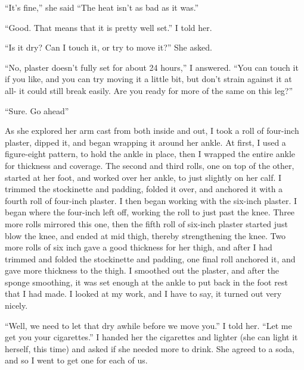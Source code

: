     ``It's fine,'' she said ``The heat isn't as bad as it was.''

    ``Good. That means that it is pretty well set.'' I told her.

    ``Is it dry? Can I touch it, or try to move it?'' She asked.

    ``No, plaster doesn't fully set for about 24 hours,'' I answered. ``You can touch it if you
like, and you can try moving it a little bit, but don't strain against it at all- it could still
break easily. Are you ready for more of the same on this leg?''

    ``Sure. Go ahead''

    As she explored her arm cast from both inside and out, I took a roll of four-inch plaster,
dipped it, and began wrapping it around her ankle. At first, I used a figure-eight pattern, to
hold the ankle in place, then I wrapped the entire ankle for thickness and coverage. The second
and third rolls, one on top of the other, started at her foot, and worked over her ankle, to
just slightly on her calf. I trimmed the stockinette and padding, folded it over, and anchored
it with a fourth roll of four-inch plaster. I then began working with the six-inch plaster. I
began where the four-inch left off, working the roll to just past the knee. Three more rolls
mirrored this one, then the fifth roll of six-inch plaster started just blow the knee, and ended
at mid thigh, thereby strengthening the knee. Two more rolls of six inch gave a good thickness
for her thigh, and after I had trimmed and folded the stockinette and padding, one final roll
anchored it, and gave more thickness to the thigh. I smoothed out the plaster, and after the
sponge smoothing, it was set enough at the ankle to put back in the foot rest that I had made. I
looked at my work, and I have to say, it turned out very nicely.

    ``Well, we need to let that dry awhile before we move you.'' I told her. ``Let me get you
your cigarettes.'' I handed her the cigarettes and lighter (she can light it herself, this time)
and asked if she needed more to drink. She agreed to a soda, and so I went to get one for each
of us.

